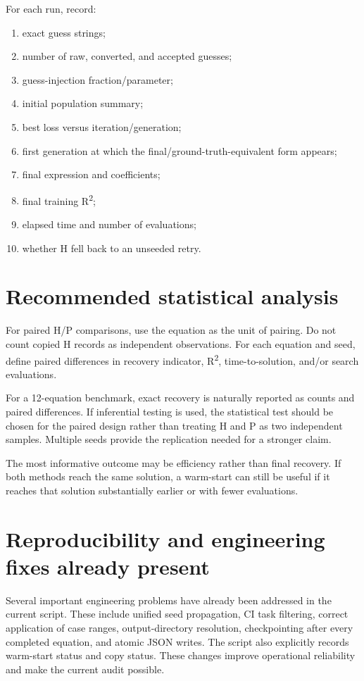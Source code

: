 \documentclass[11pt]{article}
\begin{document}
For each run, record:
\begin{enumerate}
    \item exact guess strings;
    \item number of raw, converted, and accepted guesses;
    \item guess-injection fraction/parameter;
    \item initial population summary;
    \item best loss versus iteration/generation;
    \item first generation at which the final/ground-truth-equivalent form appears;
    \item final expression and coefficients;
    \item final training R\textsuperscript{2};
    \item elapsed time and number of evaluations;
    \item whether H fell back to an unseeded retry.
\end{enumerate}

\section{Recommended statistical analysis}

For paired H/P comparisons, use the equation as the unit of pairing. Do not count copied H records as independent observations. For each equation and seed, define paired differences in recovery indicator, R\textsuperscript{2}, time-to-solution, and/or search evaluations.

For a 12-equation benchmark, exact recovery is naturally reported as counts and paired differences. If inferential testing is used, the statistical test should be chosen for the paired design rather than treating H and P as two independent samples. Multiple seeds provide the replication needed for a stronger claim.

The most informative outcome may be efficiency rather than final recovery. If both methods reach the same solution, a warm-start can still be useful if it reaches that solution substantially earlier or with fewer evaluations.

\section{Reproducibility and engineering fixes already present}

Several important engineering problems have already been addressed in the current script. These include unified seed propagation, CI task filtering, correct application of case ranges, output-directory resolution, checkpointing after every completed equation, and atomic JSON writes. The script also explicitly records warm-start status and copy status. These changes improve operational reliability and make the current audit possible.
\end{document}
